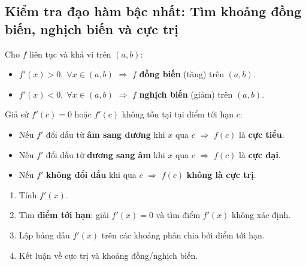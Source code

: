 \documentclass[12pt,a4paper]{article}
\begin{document}
\subsection{Kiểm tra đạo hàm bậc nhất: Tìm khoảng đồng biến, nghịch biến và cực trị}

\begin{dinhly}[title={Kiểm tra đồng biến/nghịch biến (First Derivative Test)}]
  Cho $f$ liên tục và khả vi trên $(a, b)$:
  \begin{itemize}
    \item $f'(x) > 0,\;\forall x \in (a,b)$ $\Rightarrow$ $f$ \textbf{đồng biến} (tăng) trên $(a,b)$.
    \item $f'(x) < 0,\;\forall x \in (a,b)$ $\Rightarrow$ $f$ \textbf{nghịch biến} (giảm) trên $(a,b)$.
  \end{itemize}
\end{dinhly}

\begin{dinhly}[title={Kiểm tra đạo hàm bậc nhất để tìm cực trị}]
  Giả sử $f'(c) = 0$ hoặc $f'(c)$ không tồn tại tại điểm tới hạn $c$:
  \begin{itemize}
    \item Nếu $f'$ đổi dấu từ \textbf{âm sang dương} khi $x$ qua $c$ $\Rightarrow$ $f(c)$ là \textbf{cực tiểu}.
    \item Nếu $f'$ đổi dấu từ \textbf{dương sang âm} khi $x$ qua $c$ $\Rightarrow$ $f(c)$ là \textbf{cực đại}.
    \item Nếu $f'$ \textbf{không đổi dấu} khi qua $c$ $\Rightarrow$ $f(c)$ \textbf{không là cực trị}.
  \end{itemize}
\end{dinhly}

\begin{phuongphap}[title={Các bước tìm cực trị bằng kiểm tra đạo hàm bậc nhất}]
  \begin{enumerate}
    \item Tính $f'(x)$.
    \item Tìm \textbf{điểm tới hạn}: giải $f'(x) = 0$ và tìm điểm $f'(x)$ không xác định.
    \item Lập bảng dấu $f'(x)$ trên các khoảng phân chia bởi điểm tới hạn.
    \item Kết luận về cực trị và khoảng đồng/nghịch biến.
  \end{enumerate}
\end{phuongphap}
\end{document}
